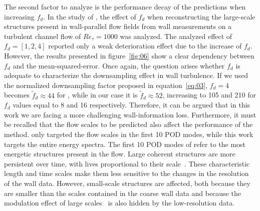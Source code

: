 The second factor to analyze is the performance decay of the predictions when increasing $f_d$.
In the study of \citet{guemes2019sensing}, the effect of $f_d$ when reconstructing the large-scale structures present in wall-parallel flow fields from wall measurements on a turbulent channel flow of $Re_{\tau}=1000$ was analyzed.
The analyzed effect of $f_d=[1,2,4]$ reported only a weak deterioration effect due to the increase of $f_d$.
However, the results presented in figure~\ref{fig:06} show a clear dependency between $f_d$ and the mean-squared-error. Once again, the question arises whether $f_d$ is adequate to characterize the downsampling effect in wall turbulence.
If we used the normalized downsampling factor proposed in equation~\ref{eq:03}, $f_d=4$ becomes $\tilde{f}_{d}\approx44$ for \citet{guemes2019sensing}, while in our case it is $\tilde{f}_{d}\approx52$, increasing to 105 and 210 for $f_d$ values equal to 8 and 16 respectively.
Therefore, it can be argued that in this work we are facing a more challenging wall-information loss.
Furthermore, it must be recalled that the flow scales to be predicted also affect the performance of the method.
\citet{guemes2019sensing} only targeted the flow scales in the first 10 POD modes, while this work targets the entire energy spectra.
The first 10 POD modes of \citet{guemes2019sensing} refer to the most energetic structures present in the flow.
Large coherent structures are more persistent over time, with lives proportional to their scale~\citep{lozano2014time}.
These characteristic length and time scales make them less sensitive to the changes in the resolution of the wall data.
However, small-scale structures are affected, both because they are smaller than the scales contained in the coarse wall data and because the modulation effect of large scales~\citep{hutchins2007large,dogan2019quantification} is also hidden by the low-resolution data.


